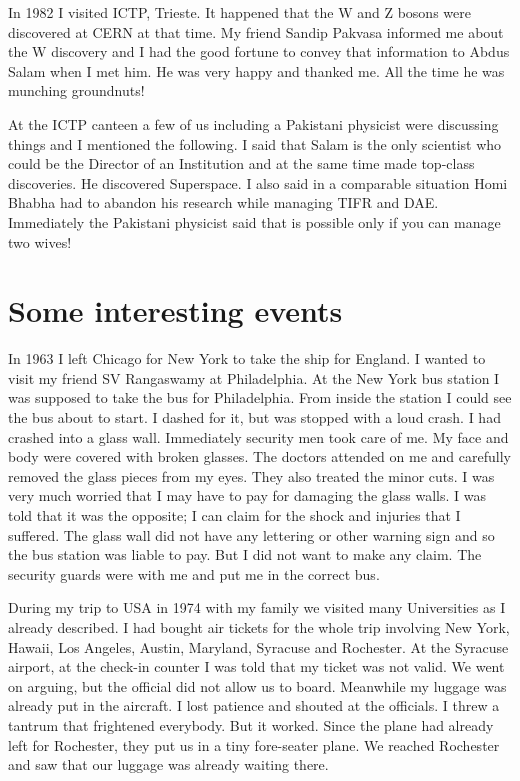 In 1982 I visited ICTP, Trieste. It happened that the W and Z bosons 
were discovered at CERN at that time. My friend Sandip Pakvasa informed 
me about the W discovery and I had the good fortune to convey that 
information to Abdus Salam when I met him. He was very happy and thanked 
me. All the time he was munching groundnuts!

At the ICTP canteen a few of us including a Pakistani physicist were 
discussing things and I mentioned the following. I said that Salam is 
the only scientist who could be the Director of an Institution and at 
the same time made top-class discoveries. He discovered Superspace. I 
also said in a comparable situation Homi Bhabha had to abandon his 
research while managing TIFR and DAE. Immediately the Pakistani 
physicist said that is possible only if you can manage two wives!

\section*{Some interesting events}

In 1963 I left Chicago for New York to take the ship for England. I 
wanted to visit my friend SV Rangaswamy at Philadelphia. At the New York 
bus station I was supposed to take the bus for Philadelphia. From inside 
the station I could see the bus about to start. I dashed for it, but was 
stopped with a loud crash. I had crashed into a glass wall. Immediately 
security men took care of me. My face and body were covered with broken 
glasses. The doctors attended on me and carefully removed the glass 
pieces from my eyes. They also treated the minor cuts. I was very much 
worried that I may have to pay for damaging the glass walls. I was told 
that it was the opposite; I can claim for the shock and injuries that I 
suffered. The glass wall did not have any lettering or other warning 
sign and so the bus station was liable to pay. But I did not want to 
make any claim. The security guards were with me and put me in the 
correct bus.

During my trip to USA in 1974 with my family we visited many 
Universities as I already described. I had bought air tickets for the 
whole trip involving New York, Hawaii, Los Angeles, Austin, Maryland, 
Syracuse and Rochester. At the Syracuse airport, at the check-in counter 
I was told that my ticket was not valid. We went on arguing, but the 
official did not allow us to board. Meanwhile my luggage was already put 
in the aircraft. I lost patience and shouted at the officials. I threw a 
tantrum that frightened everybody. But it worked. Since the plane had 
already left for Rochester, they put us in a tiny fore-seater plane. We 
reached Rochester and saw that our luggage was already waiting there.

